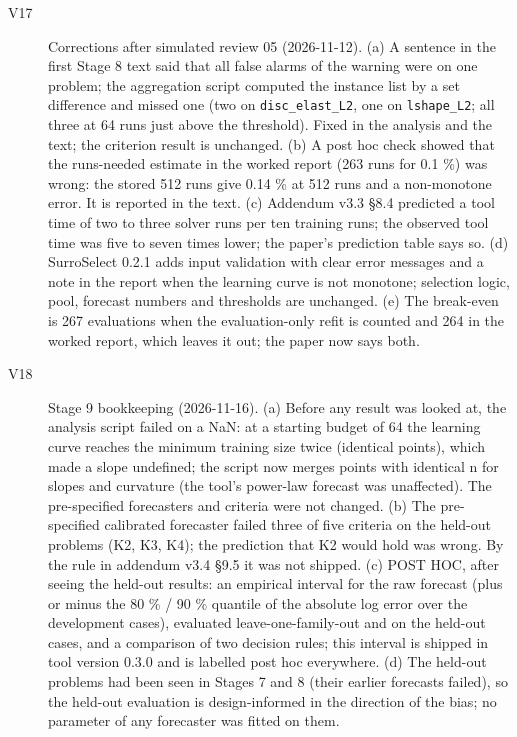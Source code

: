 \begin{description}
\item[V17] Corrections after simulated review 05 (2026-11-12). (a) A sentence in the first Stage 8 text said that all false alarms of the warning were on one problem; the aggregation script computed the instance list by a set difference and missed one (two on \texttt{disc\_\allowbreak{}elast\_\allowbreak{}L2}, one on \texttt{lshape\_\allowbreak{}L2}; all three at 64 runs just above the threshold). Fixed in the analysis and the text; the criterion result is unchanged. (b) A post hoc check showed that the runs-needed estimate in the worked report (263 runs for 0.1 \%) was wrong: the stored 512 runs give 0.14 \% at 512 runs and a non-monotone error. It is reported in the text. (c) Addendum v3.3 §8.4 predicted a tool time of two to three solver runs per ten training runs; the observed tool time was five to seven times lower; the paper's prediction table says so. (d) SurroSelect 0.2.1 adds input validation with clear error messages and a note in the report when the learning curve is not monotone; selection logic, pool, forecast numbers and thresholds are unchanged. (e) The break-even is 267 evaluations when the evaluation-only refit is counted and 264 in the worked report, which leaves it out; the paper now says both.
\item[V18] Stage 9 bookkeeping (2026-11-16). (a) Before any result was looked at, the analysis script failed on a NaN: at a starting budget of 64 the learning curve reaches the minimum training size twice (identical points), which made a slope undefined; the script now merges points with identical n for slopes and curvature (the tool's power-law forecast was unaffected). The pre-specified forecasters and criteria were not changed. (b) The pre-specified calibrated forecaster failed three of five criteria on the held-out problems (K2, K3, K4); the prediction that K2 would hold was wrong. By the rule in addendum v3.4 §9.5 it was not shipped. (c) POST HOC, after seeing the held-out results: an empirical interval for the raw forecast (plus or minus the 80 \% / 90 \% quantile of the absolute log error over the development cases), evaluated leave-one-family-out and on the held-out cases, and a comparison of two decision rules; this interval is shipped in tool version 0.3.0 and is labelled post hoc everywhere. (d) The held-out problems had been seen in Stages 7 and 8 (their earlier forecasts failed), so the held-out evaluation is design-informed in the direction of the bias; no parameter of any forecaster was fitted on them.

\end{description}
